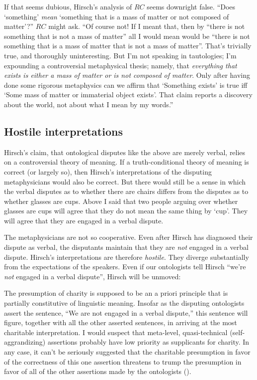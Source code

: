 \documentclass[11pt]{article}
\newenvironment{squote}{%
\begin{spacing}{1}
       	\begin{list}{}{%
\setlength{\labelwidth}{0pt}%
\rightmargin\leftmargin%
}
\item\relax
}{%
\end{list}%
\end{spacing}
}
\begin{document}
\begin{spacing}{1.25}
If that seems dubious, Hirsch's analysis of $RC$ seems downright
false.  ``Does `something' {\em mean} `something that is a mass of
matter or not composed of matter'?''  $RC$ might ask.  ``Of course
not!  If I meant that, then by ``there is not something that is not a
mass of matter'' all I would mean would be ``there is not something
that is a mass of matter that is not a mass of matter''.  That's
trivially true, and thoroughly uninteresting.  But I'm not speaking in
tautologies; I'm expounding a controversial metaphysical thesis;
namely, that {\em everything that exists is either a mass of matter or
  is not composed of matter}.  Only after having done some rigorous
metaphysics can we affirm that `Something exists' is true iff `Some
mass of matter or immaterial object exists'.  That claim reports a
discovery about the world, not about what I mean by my words.''

\subsection{Hostile interpretations}
\label{hostile}
Hirsch's claim, that ontological disputes like the above are merely
verbal, relies on a controversial theory of meaning.  If a
truth-conditional theory of meaning is correct (or largely so), then
Hirsch's interpretations of the disputing metaphysicians would also be
correct.  But there would still be a sense in which the verbal
disputes as to whether there are chairs differs from the disputes as
to whether glasses are cups.  Above I said that two people arguing
over whether glasses are cups will agree that they do not mean the
same thing by `cup'.  They will agree that they are engaged in a
verbal dispute.

The metaphysicians are not so cooperative.  Even after Hirsch has
diagnosed their dispute as verbal, the disputants maintain that they
are {\em not} engaged in a verbal dispute.  Hirsch's interpretations
are therefore \emph{hostile}.  They diverge substantially from the
expectations of the speakers.  Even if our ontologists tell Hirsch
``we're \emph{not} engaged in a verbal dispute'', Hirsch will be
unmoved:

\begin{squote}
The presumption of charity is supposed to be an a priori principle
that is partially constitutive of linguistic meaning.  Insofar as the
disputing ontologists assert the sentence, ``We are not engaged in a
verbal dispute,'' this sentence will figure, together with all the
other asserted sentences, in arriving at the most charitable
interpretation.  I would suspect that meta-level, quasi-technical
(self-aggrandizing) assertions probably have low priority as
supplicants for charity.  In any case, it can't be seriously suggested
that the charitable presumption in favor of the correctness of this
one assertion threatens to trump the presumption in favor of all of
the other assertions made by the ontologists (\citeyear{hirsch2008}).
\end{squote}


\end{spacing}
\end{document}
